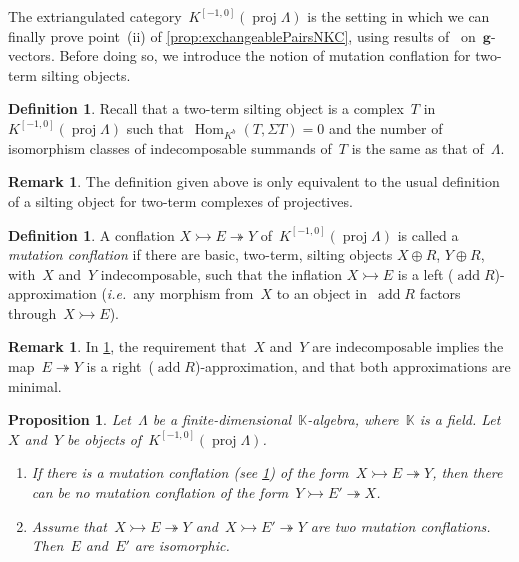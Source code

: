 \documentclass{amsart}
\newtheorem{proposition}[theorem]{Proposition}
\theoremstyle{definition}
\newtheorem{definition}[theorem]{Definition}
\newtheorem{remark}[theorem]{Remark}
\renewcommand{\b}[1]{{\boldsymbol{#1}}} %
\newcommand{\ie}{\textit{i.e.}~} %
\newcommand{\darkblue}{\color{darkblue}} %
\newcommand{\defn}[1]{\textsl{\darkblue #1}} %
\newcommand{\field}{\mathbb{K}}
\newcommand{\Hom}[1]{\operatorname{Hom}_{#1}}
\newcommand{\susp}{\Sigma}
\newcommand{\add}{\operatorname{add}}
\newcommand{\proj}{\operatorname{proj}}
\newcommand{\infl}{\rightarrowtail}
\newcommand{\defl}{\twoheadrightarrow}
\begin{document}
The extriangulated category~$K^{[-1,0]}(\proj \Lambda)$ is the setting in which we can finally prove point~(ii) of \cref{prop:exchangeablePairsNKC}, using results of~\cite{DemonetIyamaJasso} on~$\b{g}$-vectors. 
Before doing so, we introduce the notion of mutation conflation for two-term silting objects.

\begin{definition}
Recall that a two-term silting object is a complex~$T$ in~$K^{[-1,0]}(\proj \Lambda)$ such that~$\Hom{K^b}(T,\susp T)=0$ and the number of isomorphism classes of indecomposable summands of~$T$ is the same as that of~$\Lambda$.
\end{definition}

\begin{remark}
The definition given above is only equivalent to the usual definition of a silting object for two-term complexes of projectives.
\end{remark}

\begin{definition}
\label{def:mutation conflation}
A conflation $X\infl E\defl Y$ of~$K^{[-1,0]}(\proj \Lambda)$ is called a \defn{mutation conflation} if there are basic, two-term, silting objects $X\oplus R$, $Y\oplus R$, with~$X$ and~$Y$ indecomposable, such that the inflation $X\infl E$ is a left ($\add R$)-approximation (\ie any morphism from~$X$ to an object in~$\add R$ factors through~$X\infl E$).
\end{definition}

\begin{remark}
In \cref{def:mutation conflation}, the requirement that~$X$ and~$Y$ are indecomposable implies the map~$E\defl Y$ is a right~($\add R$)-approximation, and that both approximations are minimal.
\end{remark}

\begin{proposition}
\label{prop:exchange conflations are unique}
Let~$\Lambda$ be a finite-dimensional~$\field$-algebra, where~$\field$ is a field. Let~$X$ and~$Y$ be objects of~$K^{[-1,0]}(\proj \Lambda)$. 
\begin{enumerate}
\item If there is a mutation conflation (see \cref{def:mutation conflation}) of the form~$X\infl E\defl Y$, then there can be no mutation conflation of the form~$Y\infl E'\defl X$.
\item Assume that~$X\infl E\defl Y$ and~$X\infl E'\defl Y$ are two mutation conflations. 
Then~$E$ and~$E'$ are isomorphic. 
\end{enumerate} 
\end{proposition}
\end{document}
